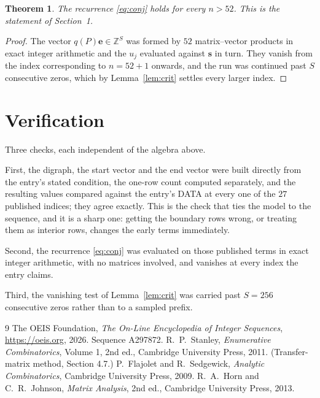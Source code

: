 \documentclass[11pt,a4paper]{article}
\theoremstyle{plain}
\newtheorem{theorem}{Theorem}
\theoremstyle{definition}
\begin{document}
\begin{theorem}
The recurrence \eqref{eq:conj} holds for every $n>52$. This is the statement of
Section~1.
\end{theorem}

\begin{proof}
The vector $q(P)\mathbf{e}\in\mathbb{Z}^{S}$ was formed by $52$ matrix--vector
products in exact integer arithmetic and the $u_j$ evaluated against $\mathbf{s}$ in turn.
They vanish from the index corresponding to $n=52+1$ onwards, and the run was continued
past $S$ consecutive zeros, which by Lemma~\ref{lem:crit} settles every larger index.
\end{proof}

\section{Verification}

Three checks, each independent of the algebra above.

First, the digraph, the start vector and the end vector were built directly from the
entry's stated condition, the one-row count computed separately, and the resulting values
compared against the entry's DATA at every one of the $27$ published indices; they
agree exactly. This is the check that ties the model to the sequence, and it is a sharp one:
getting the boundary rows wrong, or treating them as interior rows, changes the early terms
immediately.

Second, the recurrence \eqref{eq:conj} was evaluated on those published terms in exact
integer arithmetic, with no matrices involved, and vanishes at every index the entry claims.

Third, the vanishing test of Lemma~\ref{lem:crit} was carried past $S=256$ consecutive
zeros rather than to a sampled prefix.

\begin{thebibliography}{9}
 The OEIS Foundation, \emph{The On-Line Encyclopedia of Integer
Sequences}, \url{https://oeis.org}, 2026. Sequence A297872.
 R.~P.~Stanley, \emph{Enumerative Combinatorics}, Volume 1, 2nd ed.,
Cambridge University Press, 2011. (Transfer-matrix method, Section 4.7.)
 P.~Flajolet and R.~Sedgewick, \emph{Analytic Combinatorics}, Cambridge
University Press, 2009.
 R.~A.~Horn and C.~R.~Johnson, \emph{Matrix Analysis}, 2nd ed., Cambridge
University Press, 2013.
\end{thebibliography}
\end{document}
